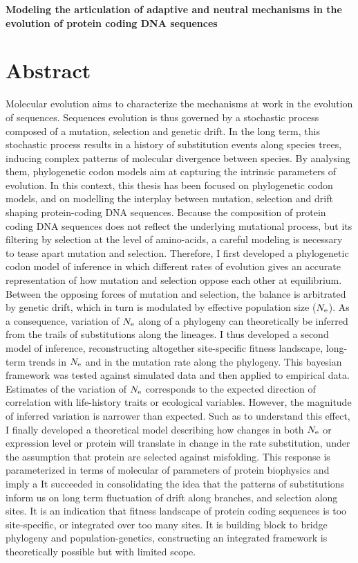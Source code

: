 \thispagestyle{empty}
\begin{center}
	\LARGE
	\textbf{Modeling the articulation of adaptive and neutral mechanisms in the evolution of protein coding DNA sequences}
\end{center}
\setlength{\parskip}{0.5em}

\section*{Abstract}

Molecular evolution aims to characterize the mechanisms at work in the evolution of sequences.
Sequences evolution is thus governed by a stochastic process composed of a mutation, selection and genetic drift.
In the long term, this stochastic process results in a history of substitution events along species trees, inducing complex patterns of molecular divergence between species.
By analysing them, phylogenetic codon models aim at capturing the intrinsic parameters of evolution.
In this context, this thesis has been focused on phylogenetic codon models, and on modelling the interplay between mutation, selection and drift shaping protein-coding DNA sequences.
Because the composition of protein coding DNA sequences does not reflect the underlying mutational process, but its filtering by selection at the level of amino-acids, a careful modeling is necessary to tease apart mutation and selection.
Therefore, I first developed a phylogenetic codon model of inference in which different rates of evolution gives an accurate representation of how mutation and selection oppose each other at equilibrium.
Between the opposing forces of mutation and selection, the balance is arbitrated by genetic drift, which in turn is modulated by effective population size ($N_{\textrm{e}}$).
As a consequence, variation of $N_{\textrm{e}}$ along of a phylogeny can theoretically be inferred from the trails of substitutions along the lineages.
I thus developed a second model of inference, reconstructing altogether site-specific fitness landscape, long-term trends in $N_{\textrm{e}}$ and in the mutation rate along the phylogeny.
This bayesian framework was tested against simulated data and then applied to empirical data.
Estimates of the variation of $N_{\textrm{e}}$ corresponds to the expected direction of correlation with life-history traits or ecological variables.
However, the magnitude of inferred variation is narrower than expected.
Such as to understand this effect, I finally developed a theoretical model describing how changes in both $N_{\textrm{e}}$ or expression level or protein will translate in change in the rate substitution, under the assumption that protein are selected against misfolding.
This response is parameterized in terms of molecular of parameters of protein biophysics and imply a
It succeeded in consolidating the idea that the patterns of \glspl{substitution} inform us on long term fluctuation of drift along branches, and selection along sites.
It is an indication that fitness landscape of protein coding sequences is too site-specific, or integrated over too many sites.
It is building block to bridge phylogeny and population-genetics, constructing an integrated framework is theoretically possible but with limited scope.
